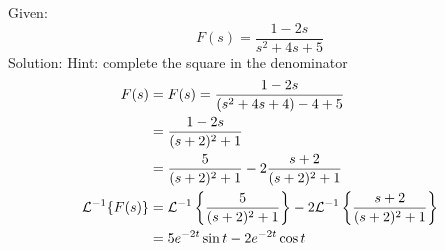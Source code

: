 \documentclass[diffeq.tex]{subfiles}
\begin{document}
\begin{homework*}[255.7]
    Given:
    \begin{equation}
        F(s) = \frac{1 - 2s}{s^{2} + 4s + 5}
    \end{equation}
    Solution:
    Hint: complete the square in the denominator
    \begin{alignat}{1}
        F(s) &= F(s) = \frac{1 - 2s}{(s^{2} + 4s + 4) - 4 + 5}\\
        &= \frac{1 - 2s}{(s + 2)^{2} + 1}\\
        &= \frac{5}{(s + 2)^{2} + 1} - 2 \frac{s + 2}{(s + 2)^{2} + 1}\\
        \mathcal{L}^{-1}\{F(s)\} &= \mathcal{L}^{-1}\left\{\frac{5}{(s + 2)^{2} + 1}\right\} - 2\mathcal{L}^{-1}\left\{\frac{s + 2}{(s + 2)^{2} + 1}\right\}\\
        &= 5e^{-2t}\sin t - 2e^{-2t}\cos t
    \end{alignat}
\end{homework*}
\np
\end{document}
